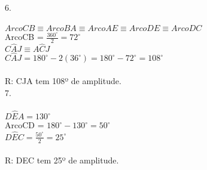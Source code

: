 \documentclass[12pt]{article}
\begin{document}
6.\\\\
$ArcoCB \equiv ArcoBA \equiv ArcoAE \equiv ArcoDE \equiv ArcoDC$\\
ArcoCB = $\frac{360^{\circ}}{2}=72^{\circ}$\\
$C\hat{A}J \equiv A\hat{C}J$\\
$C\hat{A}J=180^{\circ}-2(36^{\circ})=180^{\circ}-72^{\circ}=108^{\circ}$\\\\
R: CJA tem 108º de amplitude.\\

7.\\\\
$D\hat{E}A=130^{\circ}$\\
ArcoCD  = $180^{\circ}-130^{\circ}=50^{\circ}$\\
$D\hat{E}C=\frac{50^{\circ}}{2}=25^{\circ}$\\\\
R: DEC tem 25º de amplitude.
\end{document}
